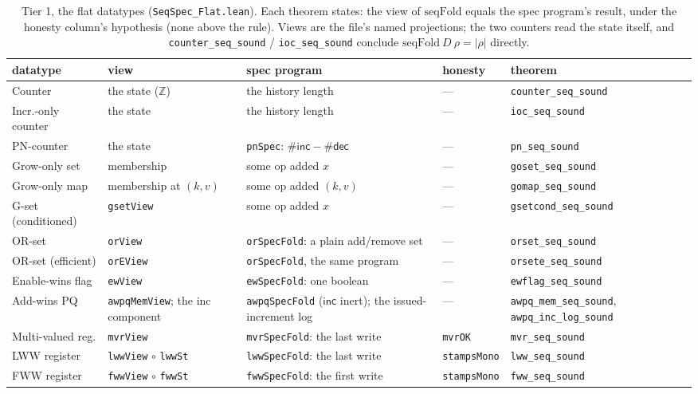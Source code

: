 \documentclass[11pt]{article}
\newcommand{\lean}[1]{\texttt{#1}}
\newcommand{\code}[1]{\texttt{#1}}
\begin{document}
\begin{table}[h]
\centering
\footnotesize
\begin{tabular}{@{}lp{2.6cm}p{3.4cm}lp{3.2cm}@{}}
\toprule
datatype & view & spec program & honesty & theorem \\
\midrule
Counter & the state ($\mathbb{Z}$) & the history length
  & --- & \lean{counter\_seq\_sound} \\
Incr.-only counter & the state & the history length
  & --- & \lean{ioc\_seq\_sound} \\
PN-counter & the state & \lean{pnSpec}:
  $\#\mathsf{inc} - \#\mathsf{dec}$
  & --- & \lean{pn\_seq\_sound} \\
Grow-only set & membership & some op added $x$
  & --- & \lean{goset\_seq\_sound} \\
Grow-only map & membership at $(k,v)$ & some op added $(k,v)$
  & --- & \lean{gomap\_seq\_sound} \\
G-set (conditioned) & \lean{gsetView} & some op added $x$
  & --- & \lean{gsetcond\_seq\_sound} \\
OR-set & \lean{orView} & \lean{orSpecFold}: a plain add/remove set
  & --- & \lean{orset\_seq\_sound} \\
OR-set (efficient) & \lean{orEView} & \lean{orSpecFold}, the same
  program & --- & \lean{orsete\_seq\_sound} \\
Enable-wins flag & \lean{ewView} & \lean{ewSpecFold}: one boolean
  & --- & \lean{ewflag\_seq\_sound} \\
Add-wins PQ & \lean{awpqMemView}; the inc component
  & \lean{awpqSpecFold} ($\mathsf{inc}$ inert); the issued-increment
  log & --- & \lean{awpq\_mem\_seq\_sound},
  \lean{awpq\_inc\_log\_sound} \\
\midrule
Multi-valued reg. & \lean{mvrView} & \lean{mvrSpecFold}: the last
  write & \lean{mvrOK} & \lean{mvr\_seq\_sound} \\
LWW register & \lean{lwwView} $\circ$ \lean{lwwSt} &
  \lean{lwwSpecFold}: the last write & \lean{stampsMono} &
  \lean{lww\_seq\_sound} \\
FWW register & \lean{fwwView} $\circ$ \lean{fwwSt} &
  \lean{fwwSpecFold}: the first write & \lean{stampsMono} &
  \lean{fww\_seq\_sound} \\
\bottomrule
\end{tabular}
\caption{Tier 1, the flat datatypes (\code{SeqSpec\_Flat.lean}). Each
theorem states: the view of $\mathrm{seqFold}$ equals the spec
program's result, under the honesty column's hypothesis (none above
the rule). Views are the file's named projections; the two counters
read the state itself, and \lean{counter\_seq\_sound} /
\lean{ioc\_seq\_sound} conclude
$\mathrm{seqFold}\ D\ \rho = |\rho|$ directly.}
\label{tab:tier1}
\end{table}
\end{document}
